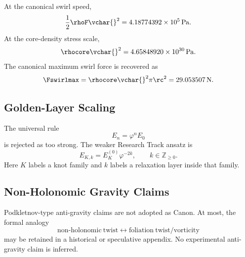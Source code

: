         At the canonical swirl speed,
        \[
            \frac{1}{2}\rhoF\vchar{}^2
            =
            4.18774392\times10^5\,\mathrm{Pa}.
        \]
        At the core-density stress scale,
        \[
            \rhocore\vchar{}^2
            =
            4.65848920\times10^{30}\,\mathrm{Pa}.
        \]
        The canonical maximum swirl force is recovered as
        \[
            \Fswirlmax
            =
            \rhocore\vchar{}^2\pi\rc^2
            =
            29.053507\,\mathrm{N}.
        \]
    
    \subsection{Golden-Layer Scaling}
        
        The universal rule
        \[
            E_n=\varphi^nE_0
        \]
        is rejected as too strong. The weaker Research Track ansatz is
        \[
            E_{K,k}
            =
            E_K^{(0)}\varphi^{-2k},
            \qquad
            k\in\mathbb Z_{\ge0}.
        \]
        Here \(K\) labels a knot family and \(k\) labels a relaxation layer inside
        that family.
    
    \subsection{Non-Holonomic Gravity Claims}
        
        Podkletnov-type anti-gravity claims are not adopted as Canon. At most, the
        formal analogy
        \[
            \mathrm{non\mbox{-}holonomic\ twist}
            \longleftrightarrow
            \mathrm{foliation\ twist/vorticity}
        \]
        may be retained in a historical or speculative appendix.
        No experimental anti-gravity claim is inferred.
        
